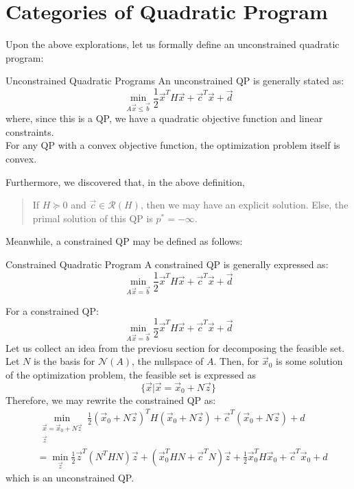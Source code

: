 \section{Categories of Quadratic Program}
Upon the above explorations, let us formally define an unconstrained quadratic program:
\begin{ln-define}{Unconstrained Quadratic Programs}{}
    An unconstrained QP is generally stated as:
    \[
        \min_{A \vec{x} \leq \vec{b}} \frac{1}{2} \vec{x}^T H \vec{x} + \vec{c}^T \vec{x} + \vec{d}
    \]
    where, since this is a QP, we have a quadratic objective function and linear constraints. \\
    For any QP with a convex objective function, the optimization problem itself is convex.
\end{ln-define}
Furthermore, we discovered that, in the above definition,
\begin{quote}
    If $H \succcurlyeq 0$ and $\vec{c} \in \mathcal{R}(H)$, then we may have an explicit solution.
    Else, the primal solution of this QP is $p^* = -\infty$.
\end{quote}
Meanwhile, a constrained QP may be defined as follows:
\begin{ln-define}{Constrained Quadratic Program}{}
    A constrained QP is generally expressed as:
    \[
        \min_{A \vec{x} = \vec{b}} \frac{1}{2} \vec{x}^T H \vec{x} + \vec{c}^T \vec{x} + \vec{d}
    \]
\end{ln-define}
For a constrained QP:
\[
    \min_{A \vec{x} = \vec{b}} \frac{1}{2} \vec{x}^T H \vec{x} + \vec{c}^T \vec{x} + \vec{d}
\]
Let us collect an idea from the previosu section for decomposing the feasible set.
Let $N$ is the basis for $\mathcal{N}(A)$, the nullspace of $A$.
Then, for $\vec{x}_0$ is some solution of the optimization problem, the feasible set is expressed as
\[
    \{
        \vec{x} | \vec{x} = \vec{x}_0 + N \vec{z}
    \}
\]
Therefore, we may rewrite the constrained QP as:
\begin{align*}
    &\min_{
        \substack{
            \vec{x} = \vec{x}_0 + N \vec{z} \\
            \vec{z}
        }
    } \frac{1}{2} {(\vec{x}_0 + N \vec{z})}^T H (\vec{x}_0 + N \vec{z}) + \vec{c}^T (\vec{x}_0 + N \vec{z}) + d \\
    &=
    \min_{\vec{z}} \frac{1}{2} \vec{z}^T (N^T H N) \vec{z} + (\vec{x}_0^T H N + \vec{c}^T N) \vec{z} + \frac{1}{2} \vec{x}_0^T H \vec{x}_0 + \vec{c}^T \vec{x}_0 + d
\end{align*}
which is an unconstrained QP.


